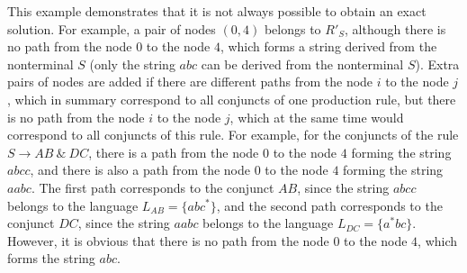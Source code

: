 This example demonstrates that it is not always possible to obtain an exact solution. For example, a pair of nodes $(0,4)$ belongs to $R'_S$, although there is no path from the node $0$ to the node $4$, which forms a string derived from the nonterminal $S$ (only the string $abc$ can be derived from the nonterminal $S$). Extra pairs of nodes are added if there are different paths from the node $i$ to the node $j$, which in summary correspond to all conjuncts of one production rule, but there is no path from the node $i$ to the node $j$, which at the same time would correspond to all conjuncts of this rule. For example, for the conjuncts of the rule $S \rightarrow AB \ \& \ DC$, there is a path from the node $0$ to the node $4$ forming the string $abcc$, and there is also a path from the node $0$ to the node $4$ forming the string $aabc$. The first path corresponds to the conjunct $AB$, since the string $abcc$ belongs to the language $L_{AB} = \{abc^*\}$, and the second path corresponds to the conjunct $DC$, since the string $aabc$ belongs to the language $L_{DC} = \{a^*bc\}$. However, it is obvious that there is no path from the node $0$ to the node $4$, which forms the string $abc$.